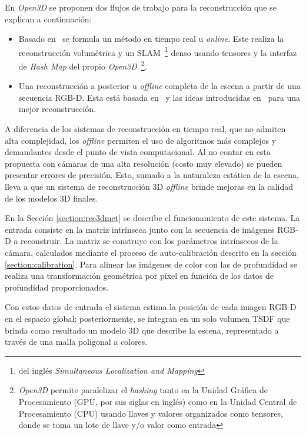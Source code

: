 {En \textit{Open3D} se proponen dos flujos de trabajo para la reconstrucción que se explican a continuación:

\begin{itemize}
	\item Basado en~\cite{dong2022ash} se formula un método en tiempo real u \textit{online}. Este realiza la reconstrucción volumétrica y un SLAM~\footnote{del inglés \textit{Simultaneous Localization and Mapping}} denso usando tensores y la interfaz de \textit{Hash Map} del propio \textit{Open3D}~\footnote{\textit{Open3D} permite paralelizar el \textit{hashing} tanto en la Unidad Gráfica de Procesamiento (GPU, por sus siglas en inglés) como en la Unidad Central de Procesamiento (CPU) usando llaves y valores organizados como tensores, donde se toma un lote de llave y/o valor como entrada}.
	\item Una reconstrucción a posterior u \textit{offline} completa de la escena a partir de una secuencia RGB-D. Esta está basada en~\cite{choi2015robust} y las ideas introducidas en~\cite{park2017colored} para una mejor reconstrucción.
\end{itemize}

A diferencia de los sistemas de reconstrucción en tiempo real, que no admiten alta complejidad, los \textit{offline} permiten el uso de algoritmos más complejos y demandantes desde el punto de vista computacional. Al no contar en esta propuesta con cámaras de una alta resolución (costo muy elevado) se pueden presentar errores de precisión.  Esto, sumado a la naturaleza estática de la escena, lleva a que un sistema de reconstrucción 3D \textit{offline} brinde mejoras en la calidad de los modelos 3D finales. 

En la Sección \ref{section:rec3dmet} se describe el funcionamiento de este sistema. La entrada consiste en la matriz intrínseca junto con la secuencia de imágenes RGB-D a reconstruir. La matriz se construye con los parámetros intrínsecos de la cámara, calculados mediante el proceso de auto-calibración descrito en la sección \ref{section:calibration}. Para alinear las imágenes de color con las de profundidad se realiza una transformación geométrica por píxel en función de los datos de profundidad proporcionados. 

Con estos datos de entrada el sistema estima la posición de cada imagen RGB-D en el espacio global; posteriormente, se integran en un solo volumen TSDF que brinda como resultado un modelo 3D que describe la escena, representado a través de una malla poligonal a colores.

}
